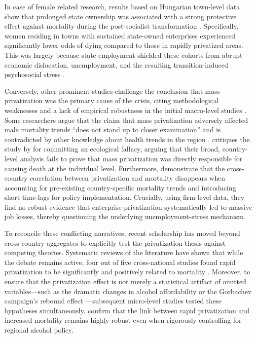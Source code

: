 \documentclass[en,magisterska]{pracamgr}
\begin{document}
In case of female related research, results based on Hungarian town-level data show that prolonged state ownership was associated with a strong 
protective effect against mortality during the post-socialist transformation \citep{Scheiring2018}. Specifically, women residing in towns with sustained state-owned enterprises 
experienced significantly lower odds of dying compared to those in rapidly privatized areas. This was largely because state employment shielded these cohorts from abrupt economic 
dislocation, unemployment, and the resulting transition-induced psychosocial stress \citep{Scheiring2018}. 

Conversely, other prominent studies challenge the conclusion that mass privatization was the primary cause of the crisis, citing methodological weaknesses and a lack of empirical robustness in the initial 
macro-level studies \citep{Earle2010, Gerry2012}. Some researchers argue that the claim that mass privatization adversely affected male mortality trends ``does not stand up to closer examination'' and is 
contradicted by other knowledge about health trends in the region \citep{Earle2010}. \citet{Gerry2012} critiques the study by \citet{Stuckler2009} for committing an ecological fallacy, arguing that their broad, 
country-level analysis fails to prove that mass privatization was directly responsible for causing death at the individual level.
Furthermore, \citet{Earle2013} demonstrate that the cross-country correlation between privatization and mortality disappears when accounting for pre-existing country-specific mortality trends 
and introducing short time-lags for policy implementation. Crucially, using firm-level data, they find no robust evidence that enterprise privatization systematically led 
to massive job losses, thereby questioning the underlying unemployment-stress mechanism.

To reconcile these conflicting narratives, recent scholarship has moved beyond cross-country aggregates to explicitly test the privatization thesis against competing theories. Systematic reviews 
of the literature have shown that while the debate remains active, four out of five cross-national studies found rapid privatization to be significantly and positively related to mortality 
\citep{Scheiring2019}. Moreover, to ensure that the privatization effect is not merely a statistical artifact of omitted variables—such as the dramatic changes in alcohol affordability 
\citep{Treisman2010} or the Gorbachev campaign's rebound effect \citep{Bhattacharya2013}—subsequent micro-level studies tested these hypotheses simultaneously. \citet{Azarova2019} confirm that the link between rapid privatization and increased mortality remains highly robust even when rigorously controlling for regional alcohol policy. 
\end{document}
